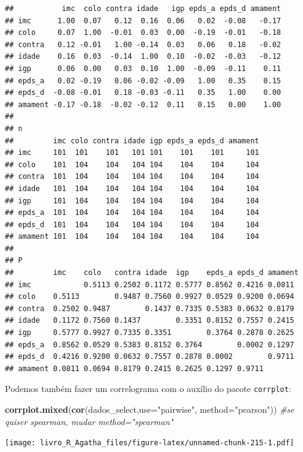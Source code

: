 \documentclass[
]{book}
\newenvironment{Shaded}{\begin{snugshade}}{\end{snugshade}}
\newcommand{\CommentTok}[1]{\textcolor[rgb]{0.56,0.35,0.01}{\textit{#1}}}
\newcommand{\DataTypeTok}[1]{\textcolor[rgb]{0.13,0.29,0.53}{#1}}
\newcommand{\KeywordTok}[1]{\textcolor[rgb]{0.13,0.29,0.53}{\textbf{#1}}}
\newcommand{\NormalTok}[1]{#1}
\newcommand{\StringTok}[1]{\textcolor[rgb]{0.31,0.60,0.02}{#1}}
\begin{document}
\begin{verbatim}
##           imc  colo contra idade   igp epds_a epds_d amament
## imc      1.00  0.07   0.12  0.16  0.06   0.02  -0.08   -0.17
## colo     0.07  1.00  -0.01  0.03  0.00  -0.19  -0.01   -0.18
## contra   0.12 -0.01   1.00 -0.14  0.03   0.06   0.18   -0.02
## idade    0.16  0.03  -0.14  1.00  0.10  -0.02  -0.03   -0.12
## igp      0.06  0.00   0.03  0.10  1.00  -0.09  -0.11    0.11
## epds_a   0.02 -0.19   0.06 -0.02 -0.09   1.00   0.35    0.15
## epds_d  -0.08 -0.01   0.18 -0.03 -0.11   0.35   1.00    0.00
## amament -0.17 -0.18  -0.02 -0.12  0.11   0.15   0.00    1.00
## 
## n
##         imc colo contra idade igp epds_a epds_d amament
## imc     101  101    101   101 101    101    101     101
## colo    101  104    104   104 104    104    104     104
## contra  101  104    104   104 104    104    104     104
## idade   101  104    104   104 104    104    104     104
## igp     101  104    104   104 104    104    104     104
## epds_a  101  104    104   104 104    104    104     104
## epds_d  101  104    104   104 104    104    104     104
## amament 101  104    104   104 104    104    104     104
## 
## P
##         imc    colo   contra idade  igp    epds_a epds_d amament
## imc            0.5113 0.2502 0.1172 0.5777 0.8562 0.4216 0.0811 
## colo    0.5113        0.9487 0.7560 0.9927 0.0529 0.9200 0.0694 
## contra  0.2502 0.9487        0.1437 0.7335 0.5383 0.0632 0.8179 
## idade   0.1172 0.7560 0.1437        0.3351 0.8152 0.7557 0.2415 
## igp     0.5777 0.9927 0.7335 0.3351        0.3764 0.2878 0.2625 
## epds_a  0.8562 0.0529 0.5383 0.8152 0.3764        0.0002 0.1297 
## epds_d  0.4216 0.9200 0.0632 0.7557 0.2878 0.0002        0.9711 
## amament 0.0811 0.0694 0.8179 0.2415 0.2625 0.1297 0.9711
\end{verbatim}

Podemos também fazer um correlograma com o auxílio do pacote \texttt{corrplot}:

\begin{Shaded}
\begin{Highlighting}[]
\KeywordTok{corrplot.mixed}\NormalTok{(}\KeywordTok{cor}\NormalTok{(dados_select,}\DataTypeTok{use=}\StringTok{"pairwise"}\NormalTok{,}
                   \DataTypeTok{method=}\StringTok{"pearson"}\NormalTok{)) }\CommentTok{#se quiser spearman, mudar method="spearman"}
\end{Highlighting}
\end{Shaded}

\texttt{[image: livro\_R\_Agatha\_files/figure-latex/unnamed-chunk-215-1.pdf]}
\end{document}

